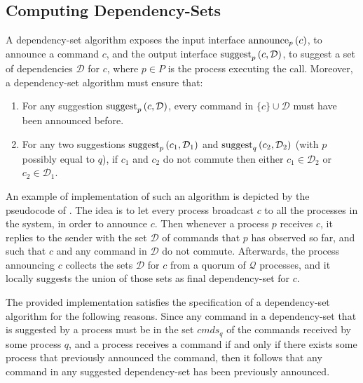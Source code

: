 

\subsection{Computing Dependency-Sets}
\label{dep-algo}

A dependency-set algorithm exposes the input interface $\operatorname{announce}_p\left( c \right)$, to announce a command $c$, and the output interface $\operatorname{suggest}_p \left( c,\mathcal{D}\right)$, to suggest a set of dependencies $\mathcal{D}$ for $c$, where $p\in P$ is the process executing the call.  
Moreover, a dependency-set algorithm must ensure that:
\begin{enumerate}
    \item For any suggestion $\operatorname{suggest}_p \left( c,\mathcal{D}\right)$, every command in $\{c\}\cup \mathcal{D}$ must have been announced before.
    \item For any two suggestions $\operatorname{suggest}_p \left( c_1,\mathcal{D}_1\right)$ and $\operatorname{suggest}_q \left( c_2,\mathcal{D}_2\right)$ (with $p$ possibly equal to $q$),  if $c_1$ and $c_2$ do not commute then either $c_1\in \mathcal{D}_2$ or $c_2 \in \mathcal{D}_1$.
\end{enumerate}

An example of implementation of such an algorithm is depicted by the pseudocode of . The idea is to let every process broadcast $c$ to all the processes in the system, in order to announce $c$. Then whenever a process $p$ receives $c$, it replies to the sender with the set $\mathcal{D}$ of commands that $p$ has observed so far, and such that $c$ and any command in $\mathcal{D}$ do not commute. Afterwards, the process announcing $c$ collects the sets $\mathcal{D}$ for $c$ from a quorum of $\mathcal{Q}$ processes, and it locally suggests the union of those sets as final dependency-set for $c$.

The provided implementation satisfies the specification of a dependency-set algorithm for the following reasons. Since any command in a dependency-set that is suggested by a process must be in the set $cmds_q$ of the commands received by some process $q$, and a process receives a command if and only if there exists some process that previously announced the command, then it follows that any command in any suggested dependency-set has been previously announced. 

